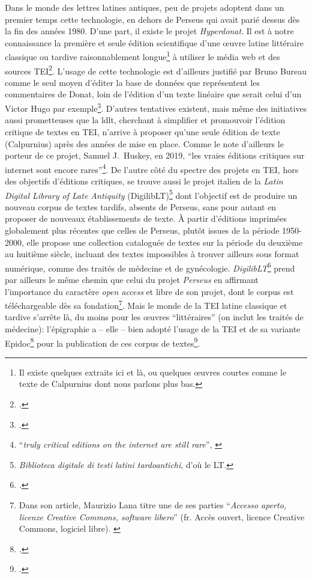 Dans le monde des lettres latines antiques, peu de projets adoptent dans un premier temps cette technologie, en dehors de Perseus qui avait parié dessus dès la fin des années 1980.  D'une part, il existe le projet \textit{Hyperdonat}. Il est à notre connaissance la première et seule édition scientifique d'une œuvre latine littéraire classique ou tardive raisonnablement longue\footnote{Il existe quelques extraits ici et là, ou quelques œuvres courtes comme le texte de Calpurnius dont nous parlons plus bas.} à utiliser le média web et des sources TEI\footcite{bureau2008hyperdonat}. L'usage de cette technologie est d'ailleurs justifié par Bruno Bureau comme le seul moyen d'éditer la base de données que représentent les commentaires de Donat, loin de l'édition d'un texte linéaire que serait celui d'un Victor Hugo par exemple\footcite[La comparaison est la nôtre.]{chaire_de_recherche_sur_les_ecritures_numeriques_exemple_2018}. D'autres tentatives existent, mais même des initiatives aussi prometteuses que la \acrfull{ldlt}, cherchant à simplifier et promouvoir l'édition critique de textes en TEI, n'arrive à proposer qu'une seule édition de texte (Calpurnius) après des années de mise en place. Comme le note d'ailleurs le porteur de ce projet, Samuel J.~Huskey, en 2019, ``les vraies éditions critiques sur internet sont encore rares''\footnote{``\textit{truly critical editions on the internet are still rare}'', \cite{huskey_digital_2019}}. De l'autre côté du spectre des projets en TEI, hors des objectifs d'éditions critiques, se trouve aussi le projet italien de la  \textit{Latin Digital Library of Late Antiquity} (DigilibLT)\footnote{\textit{Biblioteca digitale di testi latini tardoantichi}, d'où le LT.} dont l'objectif est de produire un nouveau corpus de textes tardifs, absents de Perseus, sans pour autant en proposer de nouveaux établissements de texte. À partir d'éditions imprimées globalement plus récentes que celles de Perseus, plutôt issues de la période 1950-2000, elle propose une collection cataloguée de textes sur la période du deuxième au huitième siècle, incluant des textes impossibles à trouver ailleurs sous format numérique, comme des traités de médecine et de gynécologie. \textit{DigilibLT}\footcite{lana_metodologie_2012} prend par ailleurs le même chemin que celui du projet \textit{Perseus} en affirmant l'importance du caractère \textit{open access} et libre de son projet, dont le corpus est téléchargeable dès sa fondation\footnote{Dans son article, Maurizio Lana titre une de ses parties ``\textit{Accesso aperto, licenze Creative Commons, software libero}'' (fr. Accès ouvert, licence Creative Commons, logiciel libre). \cite{lana_metodologie_2012}}. Mais le monde de la TEI latine classique et tardive s'arrête là, du moins pour les œuvres ``littéraires'' (on inclut les traités de médecine): l'épigraphie a -- elle -- bien adopté l'usage de la TEI et de sa variante Epidoc\footcite{elliott2007epidoc} pour la publication de ces corpus de textes\footcite{bodard2007inscriptions,cayless2010epigraphy}.

